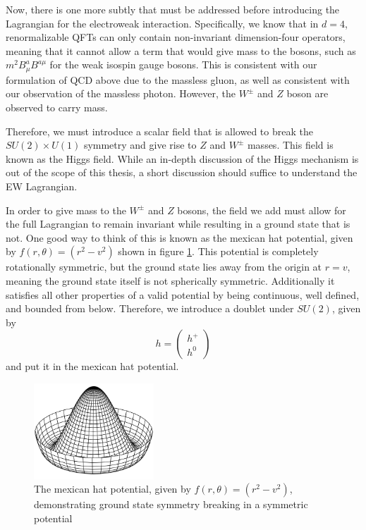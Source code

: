Now, there is one more subtly that must be addressed before introducing the Lagrangian for the electroweak interaction. Specifically, we know that in $d=4$, renormalizable QFTs can only contain non-invariant dimension-four operators, meaning that it cannot allow a term that would give mass to the bosons, such as $m^2 B_{\mu}^aB^{a\mu}$ for the weak isospin gauge bosons.  This is consistent with our formulation of QCD above due to the massless gluon, as well as consistent with our observation of the massless photon. However, the $W^\pm$ and $Z$ boson are observed to carry mass.

Therefore, we must introduce a scalar field that is allowed to break the $SU(2) \times U(1)$ symmetry and give rise to $Z$ and $W^\pm$ masses. This field is known as the Higgs field. While an in-depth discussion of the Higgs mechanism is out of the scope of this thesis, a short discussion should suffice to understand the EW Lagrangian.

In order to give mass to the $W^\pm$ and $Z$ bosons, the field we add must allow for the full Lagrangian to remain invariant while resulting in a ground state that is not. One good way to think of this is known as the mexican hat potential, given by $f(r, \theta) = (r^2 - v^2)$ shown in figure \ref{fig:mexican_hat_potential}. This potential is completely rotationally symmetric, but the ground state lies away from the origin at $r = v$, meaning the ground state itself is not spherically symmetric. Additionally it satisfies all other properties of a valid potential by being continuous, well defined, and bounded from below. Therefore, we introduce a doublet under $SU(2)$, given by
\begin{equation}
h = \begin{pmatrix}
h^+ \\ h^0
\end{pmatrix}
\end{equation}
and put it in the mexican hat potential. 

\begin{figure}[ht!]
    \centering
    \includegraphics[width=0.4\textwidth]{figures/chapter2/mexican_hat_potential.png}
    \caption{The mexican hat potential, given by $f(r, \theta) = (r^2 - v^2)$, demonstrating ground state symmetry breaking in a symmetric potential}
    \label{fig:mexican_hat_potential}
\end{figure}

